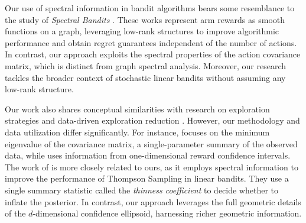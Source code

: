 Our use of spectral information in bandit algorithms bears some resemblance to the study of \emph{Spectral Bandits} \citep{valko2014spectral, kocak2014Spectral, kocak2020spectral, kocak2020Best}. These works represent arm rewards as smooth functions on a graph, leveraging low-rank structures to improve algorithmic performance and obtain regret guarantees independent of the number of actions. In contrast, our approach exploits the spectral properties of the action covariance matrix, which is distinct from graph spectral analysis. Moreover, our research tackles the broader context of stochastic linear bandits without assuming any low-rank structure.

Our work also shares conceptual similarities with research on exploration strategies \citep{russo2016information, kirschner2018heteroscedastic} and data-driven exploration reduction \citep{bastani2021mostly, pacchiano2020regret, hamidi2020frequentist, hamidi2020general}. However, our methodology and data utilization differ significantly. For instance, \cite{bastani2021mostly} focuses on the minimum eigenvalue of the covariance matrix, a single-parameter summary of the observed data, while \cite{hamidi2020general} uses information from one-dimensional reward confidence intervals. The work of \cite{hamidi2020frequentist} is more closely related to ours, as it employs spectral information to improve the performance of Thompson Sampling in linear bandits. They use a single summary statistic called the \emph{thinness coefficient} to decide whether to inflate the posterior. In contrast, our approach leverages the full geometric details of the $d$-dimensional confidence ellipsoid, harnessing richer geometric information.



